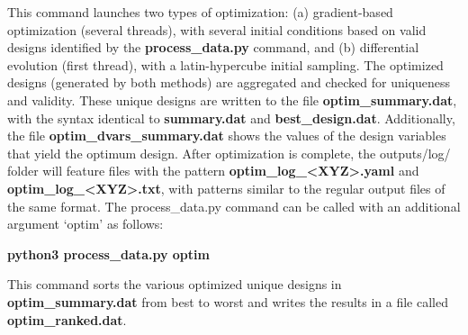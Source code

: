\begin{enumerate}
This command launches two types of optimization: (a) gradient-based optimization (several threads), with several initial conditions based on valid designs identified by the \textbf{process\_data.py} command, and (b) differential evolution (first thread), with a latin-hypercube initial sampling. The optimized designs (generated by both methods) are aggregated and checked for uniqueness and validity. These unique designs are written to the file \textbf{optim\_summary.dat}, with the syntax identical to \textbf{summary.dat} and \textbf{best\_design.dat}. Additionally, the file \textbf{optim\_dvars\_summary.dat} shows the values of the design variables that yield the optimum design. After optimization is complete, the outputs/log/ folder will feature files with the pattern \textbf{optim\_log\_<XYZ>.yaml} and \textbf{optim\_log\_<XYZ>.txt}, with patterns similar to the regular output files of the same format. The process\_data.py command can be called with an additional argument `optim' as follows:
\begin{center}
\textbf{python3 process\_data.py optim}
\end{center}
This command sorts the various optimized unique designs in \textbf{optim\_summary.dat} from best to worst and writes the results in a file called \textbf{optim\_ranked.dat}.

\end{enumerate}